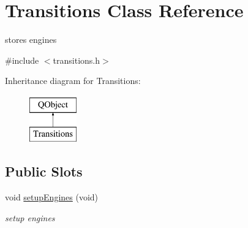 \hypertarget{class_transitions}{}\section{Transitions Class Reference}
\label{class_transitions}


stores engines  




{\ttfamily \#include $<$transitions.\+h$>$}

Inheritance diagram for Transitions\+:\begin{figure}[H]
\begin{center}
\leavevmode
\includegraphics[height=2.000000cm]{class_transitions}
\end{center}
\end{figure}
\subsection*{Public Slots}
\begin{DoxyCompactItemize}
\item 
\mbox{\label{class_transitions_a2d0a9917c75bb437e6ead23c3fe22dd3}} 
void \hyperlink{class_transitions_a2d0a9917c75bb437e6ead23c3fe22dd3}{setup\+Engines} (void)
\begin{DoxyCompactList}\small\item\em setup engines \end{DoxyCompactList}\end{DoxyCompactItemize}
